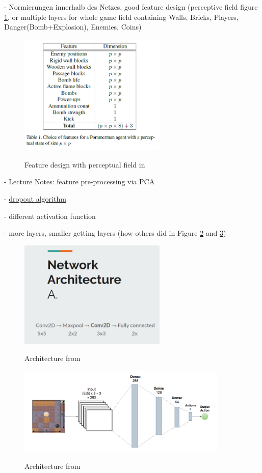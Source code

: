 \documentclass[a4paper ,12pt]{report}
\begin{document}
	- Normierungen innerhalb des Netzes, good feature design (perceptive field figure \ref{fig:feat1}, or multiple layers for whole game field containing Walls, Bricks, Players, Danger(Bomb+Explosion), Enemies, Coins)
	
	\begin{figure}[ht]
		\caption{Feature design with perceptual field in \cite{Pommerman}}
		\includegraphics[width=7cm]{features_with_perceptual_field.png}
		\label{fig:feat1}
	\end{figure}
	
	- Lecture Notes: feature pre-processing via PCA
	
	- \href{https://wandb.ai/authors/ayusht/reports/Dropout-in-PyTorch-An-Example--VmlldzoxNTgwOTE}{dropout algorithm}
	
	- different activation function
	
	- more layers, smaller getting layers (how others did in Figure \ref{fig:arch1} and \ref{fig:arch2})
	
	\begin{figure}[ht]
		\caption{Architecture from \cite{AlanPresentation}}
		\includegraphics[width=7cm]{architecture.png}
		\label{fig:arch1}
	\end{figure}

	\begin{figure}[ht]
		\caption{Architecture from \cite{Pommerman}}
		\includegraphics[width=10cm]{architecture_2.png}
		\label{fig:arch2}
	\end{figure}
	
\end{document}
